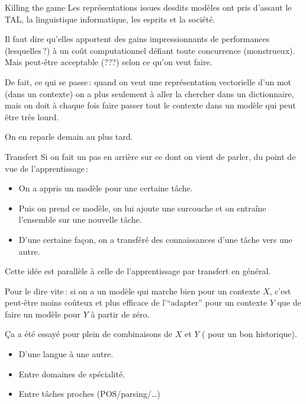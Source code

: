 \documentclass[
	xcolor={svgnames},
	aspectratio=169,
	french,
]{beamer}
\begin{document}
\begin{frame}{Killing the game}
	Les représentations issues desdits modèles ont pris d'assaut le TAL, la linguistique informatique, les esprits et la société.

	\pause

	Il faut dire qu'elles apportent des gains impressionnants de performances (lesquelles ?) \pause à un coût computationnel défiant toute concurrence \pause (monstrueux). \pause Mais peut-être acceptable (???) selon ce qu'on veut faire.

	\pause

	De fait, ce qui se passe : quand on veut une représentation vectorielle d'un mot (dans un contexte) on a plus seulement à aller la chercher dans un \alert{dictionnaire}, mais on doit à chaque fois faire passer tout le contexte dans un \alert{modèle} qui peut être très lourd.

	\pause

	On en reparle demain au plus tard.
 \end{frame}

\begin{frame}{Transfert}
	Si on fait un pas en arrière sur ce dont on vient de parler, du point de vue de l'apprentissage :

	\pause

	\begin{itemize}[<+->]
		\item On a appris un modèle pour une certaine tâche.
		\item Puis on prend ce modèle, on lui ajoute une surcouche et on entraîne l'ensemble sur une nouvelle tâche.
		\item D'une certaine façon, on a \alert{transféré} des connaissances d'une tâche vers une autre.
	\end{itemize}
\end{frame}

\begin{frame}{}
	Cette idée est parallèle à celle de l'\alert{apprentissage par transfert} en général.

	\pause

	Pour le dire vite : si on a un modèle qui marche bien pour un contexte \(X\), c'est peut-être moins coûteux et plus efficace de l'\enquote{\alert{adapter}} pour un contexte \(Y\) que de faire un modèle pour \(Y\) à partir de zéro.

	\pause

	Ça a été essayé pour plein de combinaisons de \(X\) et \(Y\) (\textcite{ruder2019NeuralTransferLearning} pour un bon historique).

	\begin{itemize}
		\item D'une langue à une autre.
		\item Entre domaines de spécialité.
		\item Entre tâches proches (POS/parsing/…)
	\end{itemize}
\end{frame}
\end{document}
